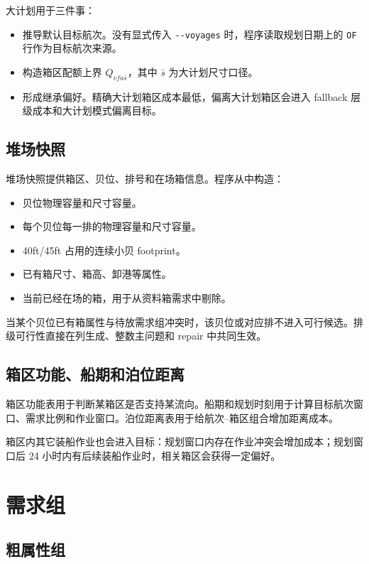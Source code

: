\documentclass[UTF8,a4paper,11pt]{ctexart}
\newcommand{\code}[1]{\nolinkurl{#1}}
\begin{document}
大计划用于三件事：
\begin{itemize}
  \item 推导默认目标航次。没有显式传入 \code{--voyages} 时，程序读取规划日期上的 \code{OF} 行作为目标航次来源。
  \item 构造箱区配额上界 \(Q_{vfa\bar{s}}\)，其中 \(\bar{s}\) 为大计划尺寸口径。
  \item 形成继承偏好。精确大计划箱区成本最低，偏离大计划箱区会进入 fallback 层级成本和大计划模式偏离目标。
\end{itemize}

\subsection{堆场快照}

堆场快照提供箱区、贝位、排号和在场箱信息。程序从中构造：
\begin{itemize}
  \item 贝位物理容量和尺寸容量。
  \item 每个贝位每一排的物理容量和尺寸容量。
  \item 40ft/45ft 占用的连续小贝 footprint。
  \item 已有箱尺寸、箱高、卸港等属性。
  \item 当前已经在场的箱，用于从资料箱需求中剔除。
\end{itemize}

当某个贝位已有箱属性与待放需求组冲突时，该贝位或对应排不进入可行候选。排级可行性直接在列生成、整数主问题和 repair 中共同生效。

\subsection{箱区功能、船期和泊位距离}

箱区功能表用于判断某箱区是否支持某流向。船期和规划时刻用于计算目标航次窗口、需求比例和作业窗口。泊位距离表用于给航次--箱区组合增加距离成本。

箱区内其它装船作业也会进入目标：规划窗口内存在作业冲突会增加成本；规划窗口后 24 小时内有后续装船作业时，相关箱区会获得一定偏好。

\section{需求组}

\subsection{粗属性组}
\end{document}
